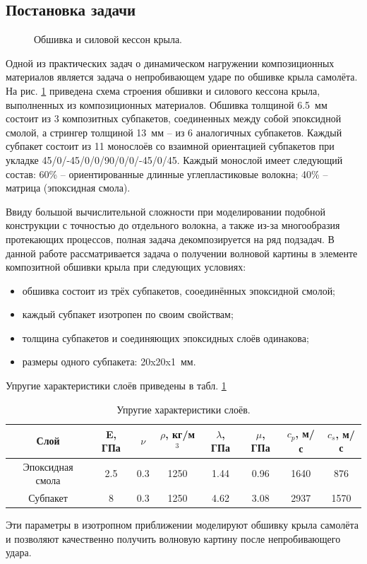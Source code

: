 \subsection*{Постановка задачи}
\begin{figure}[h]
\caption{Обшивка и силовой кессон крыла.}
\label{pic:construction}
\end{figure}
Одной из практических задач о динамическом нагружении композиционных материалов
является задача о непробивающем ударе по обшивке крыла самолёта. На рис.
\ref{pic:construction} приведена схема строения обшивки и силового кессона
крыла, выполненных из композиционных материалов. Обшивка толщиной 6.5~мм состоит 
из 3 композитных субпакетов, соединенных между собой эпоксидной смолой, 
а стрингер толщиной 13~мм -- из 6 аналогичных субпакетов. Каждый субпакет
состоит из 11 монослоёв со взаимной ориентацией субпакетов при укладке 
45/0/-45/0/0/90/0/0/-45/0/45. Каждый монослой имеет следующий состав: 60\% -- 
ориентированные длинные углепластиковые волокна; 40\% -- матрица
(эпоксидная смола). 

Ввиду большой вычислительной сложности при моделировании подобной конструкции с 
точностью до отдельного волокна, а также из-за многообразия протекающих процессов, 
полная задача декомпозируется на ряд подзадач. В данной работе рассматривается задача о получении
волновой картины в элементе композитной обшивки крыла при следующих условиях:
\begin{itemize}
\item обшивка состоит из трёх субпакетов, сооединённых эпоксидной смолой;
\item каждый субпакет изотропен по своим свойствам;
\item толщина субпакетов и соединяющих эпоксидных слоёв одинакова;
\item размеры одного субпакета: 20x20x1~мм.
\end{itemize}
Упругие характеристики слоёв приведены в табл. \ref{tbl:subpackage}
\begin{table}
\centering
\begin{tabular}{|c|c|c|c|c|c|c|c|}
\hline
Слой & E, ГПа & $\nu$ & $\rho$, кг/м$^{3}$ & $\lambda$, ГПа & $\mu$, ГПа &
$c_p$, м/с & $c_s$, м/с \\
\hline
Эпоксидная смола & 2.5 & 0.3 & 1250 & 1.44 & 0.96 & 1640 & 876 \\
Субпакет & 8 & 0.3 & 1250 & 4.62 & 3.08 & 2937 & 1570 \\
\hline
\end{tabular}
\caption{Упругие характеристики слоёв.}
\label{tbl:subpackage}
\end{table}
Эти параметры в изотропном приближении моделируют обшивку крыла самолёта и
позволяют качественно получить волновую картину после непробивающего удара.

